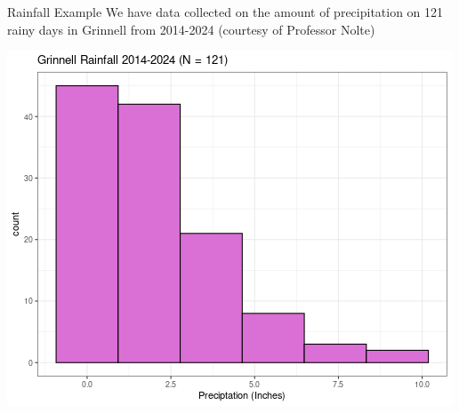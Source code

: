 \documentclass{beamer}
\begin{document}
\begin{frame}{Rainfall Example}
We have data collected on the amount of precipitation on 121 rainy days in Grinnell from 2014-2024 (courtesy of Professor Nolte) \vspace{2mm}

\begin{center}
\includegraphics[scale=0.48]{grin_rain.png}
\end{center}
\end{frame}
\end{document}
